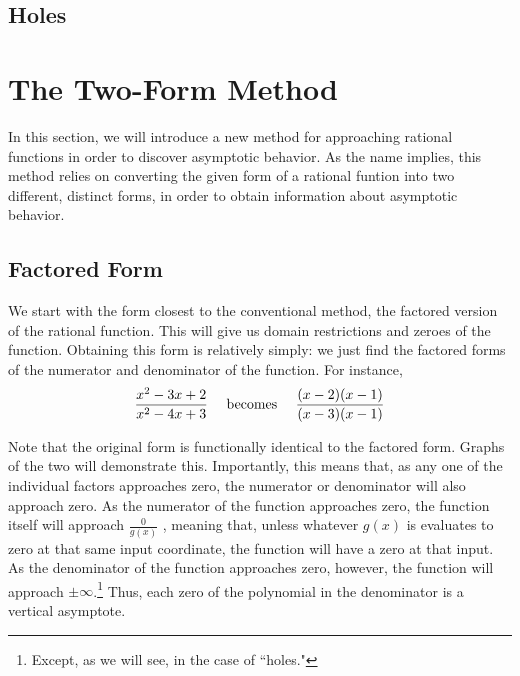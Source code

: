 \documentclass[12pt]{article}
\begin{document}
\subsection{Holes}			%

\section{The Two-Form Method}

In this section, we will introduce a new method for approaching 		%
rational functions in order to discover asymptotic behavior. As the
name implies, this method relies on converting the given form of
a rational funtion into two different, distinct forms, in order to 
obtain information about asymptotic behavior.\\

\subsection{Factored Form}

We start with the form closest to the conventional method, the 
factored version of the rational function. This will give us domain 
restrictions and zeroes of the function. Obtaining this form is 
relatively simply: we just find the factored forms of the numerator
and denominator of the function. For instance, 
	\[\frac{x^2-3x+2}{x^2-4x+3} \ \ \ \ 
	\textnormal{becomes} \ \ \ \ 
	\frac{(x-2)(x-1)}{(x-3)(x-1)}\]

Note that the original form is functionally identical to the factored
form. Graphs of the two will demonstrate this. Importantly, this
means that, as any one of the individual factors approaches
zero, the numerator or denominator will also approach
zero. As the numerator of the function approaches zero, the function
itself will approach 
	\(\displaystyle\frac{0}{g(x)}\)
, meaning that, unless whatever $g(x)$ is evaluates to zero at that same input 		%
coordinate, the function will have a zero at that input. \\

As the denominator of the function approaches zero, however, the 
function will approach 
$\pm\infty$.\footnote{Except, as we will see, in the case of ``holes."} 
Thus, each zero of the polynomial in the denominator is a vertical asymptote.\\
\end{document}
